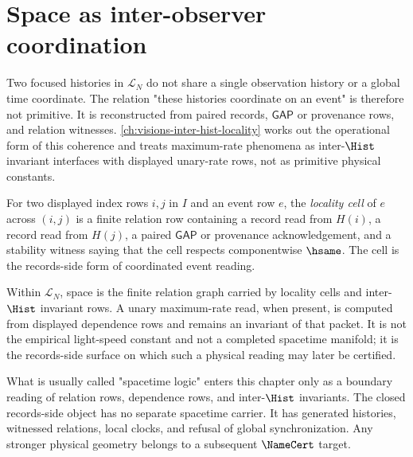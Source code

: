 \section{Space as inter-observer coordination}
\label{sec:consciousness-universe-space-as-coordination}

\begin{principle}
\label{prin:consciousness-universe-no-god-eye}
Two focused histories in $\mathcal{L}_N$ do not share a single observation history or a global time coordinate. The relation "these histories coordinate on an event" is therefore not primitive. It is reconstructed from paired records, $\mathsf{GAP}$ or provenance rows, and relation witnesses. \autoref{ch:visions-inter-hist-locality} works out the operational form of this coherence and treats maximum-rate phenomena as inter-$\Hist$ invariant interfaces with displayed unary-rate rows, not as primitive physical constants.
\end{principle}

\begin{definition}
\label{def:consciousness-universe-locality-cell}
For two displayed index rows $i,j$ in $I$ and an event row $e$, the \emph{locality cell} of $e$ across $(i,j)$ is a finite relation row containing a record read from $H(i)$, a record read from $H(j)$, a paired $\mathsf{GAP}$ or provenance acknowledgement, and a stability witness saying that the cell respects componentwise $\hsame$. The cell is the records-side form of coordinated event reading.
\end{definition}

\begin{example}
\label{ex:consciousness-universe-space-as-geometry}
Within $\mathcal{L}_N$, space is the finite relation graph carried by locality cells and inter-$\Hist$ invariant rows. A unary maximum-rate read, when present, is computed from displayed dependence rows and remains an invariant of that packet. It is not the empirical light-speed constant and not a completed spacetime manifold; it is the records-side surface on which such a physical reading may later be certified.
\end{example}

\begin{remark}
\label{rem:consciousness-universe-spacetime-logic}
What is usually called "spacetime logic" enters this chapter only as a boundary reading of relation rows, dependence rows, and inter-$\Hist$ invariants. The closed records-side object has no separate spacetime carrier. It has generated histories, witnessed relations, local clocks, and refusal of global synchronization. Any stronger physical geometry belongs to a subsequent $\NameCert$ target.
\end{remark}

